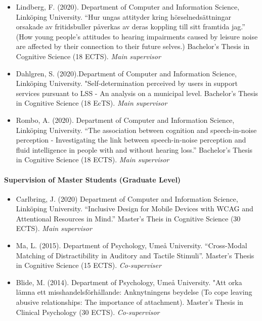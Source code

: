 \documentclass[]{article}
\begin{document}
\begin{itemize}
\item
  Lindberg, F. (2020). Department of Computer and Information Science,
  Linköping University. ``Hur ungas attityder kring hörselnedsättningar
  orsakade av fritidsbuller påverkas av deras koppling till sitt
  framtida jag.'' (How young people's attitudes to hearing impairments
  caused by leisure noise are affected by their connection to their
  future selves.) Bachelor's Thesis in Cognitive Science (18 ECTS).
  \emph{Main supervisor}
\item
  Dahlgren, S. (2020).Department of Computer and Information Science,
  Linköping University. "Self-determination perceived by users in
  support services pursuant to LSS - An analysis on a municipal level.
  Bachelor's Thesis in Cognitive Science (18 EcTS). \emph{Main
  supervisor}
\item
  Rombo, A. (2020). Department of Computer and Information Science,
  Linköping University. ``The association between cognition and
  speech-in-noise perception - Investigating the link between
  speech-in-noise perception and fluid intelligence in people with and
  without hearing loss.'' Bachelor's Thesis in Cognitive Science (18
  ECTS). \emph{Main supervisor}
\end{itemize}

\hypertarget{supervision-of-master-students-graduate-level}{%
\paragraph{Supervision of Master Students (Graduate
Level)}\label{supervision-of-master-students-graduate-level}}

\begin{itemize}
\item
  Carlbring, J. (2020) Department of Computer and Information Science,
  Linköping University. ``Inclusive Design for Mobile Devices with WCAG
  and Attentional Resources in Mind.'' Master's Theis in Cognitive
  Science (30 ECTS). \emph{Main supervisor}
\item
  Ma, L. (2015). Department of Psychology, Umeå University.
  ``Cross-Modal Matching of Distractibility in Auditory and Tactile
  Stimuli''. Master's Thesis in Cognitive Science (15 ECTS).
  \emph{Co-superviser}
\item
  Blide, M. (2014). Department of Psychology, Umeå University. "Att orka
  lämna ett misshandelsförhållande: Anknytningens beydelse (To cope
  leaving abusive relationships: The importance of attachment). Master's
  Thesis in Clinical Psychology (30 ECTS). \emph{Co-supervisor}
\end{itemize}
\end{document}

